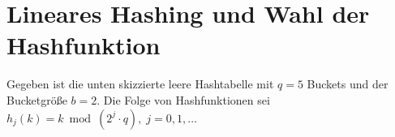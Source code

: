 \section{Lineares Hashing und Wahl der Hashfunktion}

Gegeben ist die unten skizzierte leere Hashtabelle mit $q = 5$ Buckets und der Bucketgröße $b = 2$. Die Folge von Hashfunktionen sei $h_{j}(k) = k \bmod(2^{j} \cdot q), \; j = 0,1,\ldots$

\begin{minipage}{0.4\textwidth}
\end{minipage}

